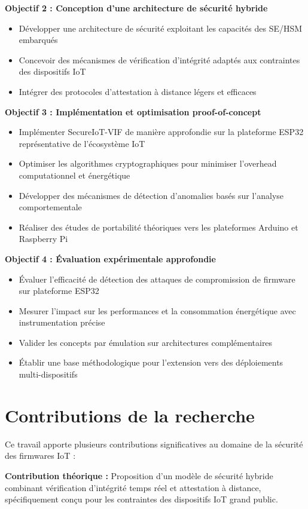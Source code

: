 \textbf{Objectif 2 : Conception d'une architecture de sécurité hybride}
\begin{itemize}
    \item Développer une architecture de sécurité exploitant les capacités des \ac{SE}/\ac{HSM} embarqués
    \item Concevoir des mécanismes de vérification d'intégrité adaptés aux contraintes des dispositifs IoT
    \item Intégrer des protocoles d'attestation à distance légers et efficaces
\end{itemize}

\textbf{Objectif 3 : Implémentation et optimisation proof-of-concept}
\begin{itemize}
    \item Implémenter SecureIoT-VIF de manière approfondie sur la plateforme ESP32 représentative de l'écosystème IoT
    \item Optimiser les algorithmes cryptographiques pour minimiser l'overhead computationnel et énergétique
    \item Développer des mécanismes de détection d'anomalies basés sur l'analyse comportementale
    \item Réaliser des études de portabilité théoriques vers les plateformes Arduino et Raspberry Pi
\end{itemize}

\textbf{Objectif 4 : Évaluation expérimentale approfondie}
\begin{itemize}
    \item Évaluer l'efficacité de détection des attaques de compromission de firmware sur plateforme ESP32
    \item Mesurer l'impact sur les performances et la consommation énergétique avec instrumentation précise
    \item Valider les concepts par émulation sur architectures complémentaires
    \item Établir une base méthodologique pour l'extension vers des déploiements multi-dispositifs
\end{itemize}

\section{Contributions de la recherche}

Ce travail apporte plusieurs contributions significatives au domaine de la sécurité des firmwares IoT :

\textbf{Contribution théorique :} Proposition d'un modèle de sécurité hybride combinant vérification d'intégrité temps réel et attestation à distance, spécifiquement conçu pour les contraintes des dispositifs IoT grand public.

